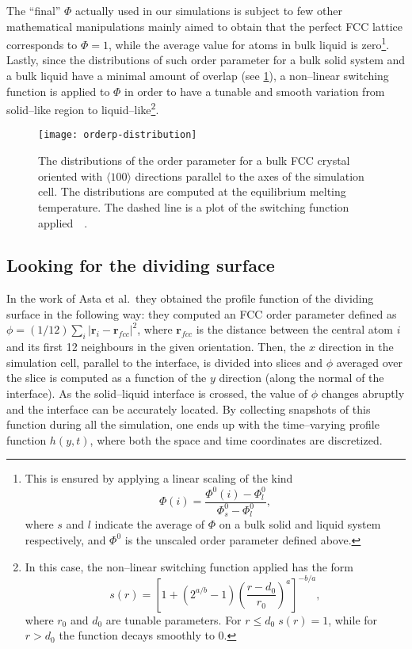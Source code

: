 The ``final'' $\Phi$ actually used in our simulations is subject to few other mathematical manipulations mainly aimed to obtain that the perfect FCC lattice corresponds to $\Phi=1$, while the average value for atoms in bulk liquid is zero\footnote{This is ensured by applying a linear scaling of the kind%
\begin{equation*}
    \Phi(i)= \frac{\Phi^0(i)-\Phi^0_l}{\Phi^0_s-\Phi^0_l},
\end{equation*}
where $s$ and $l$ indicate the average of $\Phi$ on a bulk solid and liquid system respectively, and $\Phi^0$ is the unscaled order parameter defined above.
}. Lastly, since the distributions of such order parameter for a bulk solid system and a bulk liquid have a minimal amount of overlap (see \cref{fig:op-dist}), a non--linear switching function is applied to $\Phi$ in order to have a tunable and smooth variation from solid--like region to liquid--like\footnote{\label{ft:sf}In this case, the non--linear switching function applied has the form%
\begin{equation*}
    s(r)=\left[1+(2^{a/b}-1)\left( \frac{r-d_0}{r_0}\right)^a\right]^{-b/a},
\end{equation*}
where $r_0$ and $d_0$ are tunable parameters. For $r\le d_0\; s(r)=1$, while for $r>d_0$ the function decays smoothly to 0. 
}.
\begin{figure}[bt]
    \centering
    \texttt{[image: orderp-distribution]}
    \caption{The distributions of the \fcc order parameter for a bulk FCC crystal oriented with $\langle 100\rangle$ directions parallel to the axes of the simulation cell. The distributions are computed at the equilibrium melting temperature. The dashed line is a plot of the switching function applied~~\cite{Cheng2015}.}
    \label{fig:op-dist}
\end{figure}




\subsection{Looking for the dividing surface}
In the work of Asta et al.\ they obtained the profile function of the dividing surface in the following way: they computed an FCC order parameter defined as $\phi=(1/12) \sum_i \lvert \bm{r}_i-\bm{r}_{fcc}\rvert^2$, where $\bm{r}_{fcc}$ is the distance between the central atom $i$ and its first 12 neighbours in the given orientation. Then, the $x$ direction in the simulation cell, parallel to the interface, is divided into slices and $\phi$ averaged over the slice is computed as a function of the $y$ direction (along the normal of the interface). As the solid--liquid interface is crossed, the value of $
\phi$ changes abruptly and the interface can be accurately located. By collecting snapshots of this function during all the simulation, one ends up with the time--varying profile function $h(y,t)$, where both the space and time coordinates are discretized.

